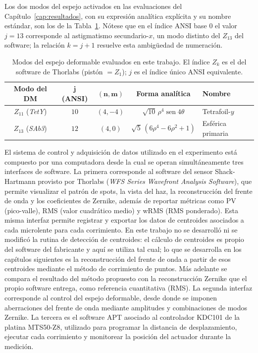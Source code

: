 \documentclass[letterpaper,12pt,oneside]{book}
\makeatletter
\DeclareMathOperator{\sen}{sen} %
\renewcommand\section{\@startsection{section}{1}{\z@}{-3.5ex \@plus -1ex \@minus -.2ex}{2.3ex \@plus.2ex}{\normalfont\Large\bfseries\raggedright}}
\makeatother
\begin{document}
Los dos modos del espejo activados en las evaluaciones del Capítulo~\ref{cap:resultados},
con su expresión analítica explícita y su nombre estándar, son los de la
Tabla~\ref{tab:modos-dm}. Nótese que en el índice ANSI base 0 el valor $j=13$ corresponde
al astigmatismo secundario-$x$, un modo distinto del $Z_{13}$ del software; la relación
$k=j+1$ resuelve esta ambigüedad de numeración.

\begin{table}[htbp]
\centering
\caption{Modos del espejo deformable evaluados en este trabajo. El índice $Z_k$ es el del
software de Thorlabs (pistón $=Z_1$); $j$ es el índice único ANSI equivalente.}
\label{tab:modos-dm}
\setlength{\tabcolsep}{4pt}
\begin{tabularx}{\textwidth}{cccc>{\raggedright\arraybackslash}X}
\hline
\textbf{Modo del DM} & $\boldsymbol{j}$ \textbf{(ANSI)} & $\boldsymbol{(n,m)}$ & \textbf{Forma analítica} & \textbf{Nombre} \\
\hline
$Z_{11}$ (\textit{TetY}) & $10$ & $(4,-4)$ & $\sqrt{10}\,\rho^4\sen 4\theta$ & Tetrafoil-$y$ \\
$Z_{13}$ (\textit{SAb3}) & $12$ & $(4,0)$  & $\sqrt{5}\,(6\rho^4-6\rho^2+1)$ & Esférica primaria \\
\hline
\end{tabularx}
\end{table}

\section{Sistema de control y adquisición de datos}\label{sec:control-adquisicion}

El sistema de control y adquisición de datos utilizado en el experimento está compuesto
por una computadora desde la cual se operan simultáneamente tres interfaces de software.
La primera corresponde al software del sensor Shack-Hartmann provisto por Thorlabs
(\textit{WFS Series Wavefront Analysis Software}), que permite visualizar el patrón de
spots, la vista del haz, la reconstrucción del frente de onda y los coeficientes de
Zernike, además de reportar métricas como PV (pico-valle), RMS (valor cuadrático medio) y
wRMS (RMS ponderado). Esta misma interfaz permite registrar y exportar los datos de
centroides asociados a cada microlente para cada corrimiento. En este trabajo no se
desarrolló ni se modificó la rutina de detección de centroides: el cálculo de centroides
es propio del software del fabricante y aquí se utiliza tal cual; lo que se desarrolla en
los capítulos siguientes es la reconstrucción del frente de onda a partir de esos
centroides mediante el método de corrimiento de puntos. Más adelante se compara el
resultado del método propuesto con la reconstrucción Zernike que el propio software
entrega, como referencia cuantitativa (RMS). La segunda interfaz corresponde al control
del espejo deformable, desde donde se imponen aberraciones del frente de onda mediante
amplitudes y combinaciones de modos Zernike. La tercera es el software APT asociado al
controlador KDC101 de la platina MTS50-Z8, utilizado para programar la distancia de
desplazamiento, ejecutar cada corrimiento y monitorear la posición del actuador durante la
medición.
\end{document}
